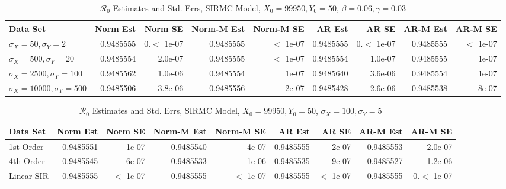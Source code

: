\documentclass[12pt]{article}
\newcommand{\rr}{\ensuremath{\mathcal{R}_0}}
\begin{document}
\begin{table}[H]
	
	\caption{\label{tab:}$\rr$ Estimates and Std. Errs, SIRMC Model,
		$X_0 = 99950, Y_0 = 50$, $\beta = 0.06, \gamma = 0.03$}
	\centering
	\begin{footnotesize}
		\begin{tabular}[t]{l|r|r|r|r|r|r|r|r}
			\hline
			Data Set & Norm Est & Norm SE & Norm-M Est & Norm-M SE & AR Est & AR SE & AR-M Est & AR-M SE\\
			\hline
			$\sigma_X = 50, \sigma_Y = 2$ & 0.9485555 & 0.$<$ 1e-07 & 0.9485555 & $<$ 1e-07 & 0.9485555 & 0.$<$ 1e-07 & 0.9485555 & $<$ 1e-07\\
			\hline
			$\sigma_X = 500, \sigma_Y = 20$ & 0.9485554 & 2.0e-07 & 0.9485555 & $<$ 1e-07 & 0.9485554 & 1.0e-07 & 0.9485555 & 1e-07\\
			\hline
			$\sigma_X = 2500, \sigma_Y = 100$ & 0.9485562 & 1.0e-06 & 0.9485554 & 1e-07 & 0.9485640 & 3.6e-06 & 0.9485554 & 1e-07\\
			\hline
			$\sigma_X = 10000, \sigma_Y = 500$ & 0.9485506 & 3.8e-06 & 0.9485556 & 2e-07 & 0.9485428 & 2.6e-06 & 0.9485538 & 8e-07\\
			\hline
		\end{tabular}
	\end{footnotesize}
\end{table}

\begin{table}[H]
	
	\caption{\label{tab:}$\rr$ Estimates and Std. Errs, SIRMC Model,
		$X_0 = 99950, Y_0 = 50$, $\sigma_X = 100, \sigma_Y = 5$}
	\centering
	\begin{footnotesize}
		\begin{tabular}[t]{l|r|r|r|r|r|r|r|r}
			\hline
			Data Set & Norm Est & Norm SE & Norm-M Est & Norm-M SE & AR Est & AR SE & AR-M Est & AR-M SE\\
			\hline
			1st Order & 0.9485551 & 1e-07 & 0.9485540 & 4e-07 & 0.9485555 & 2e-07 & 0.9485553 & 2.0e-07\\
			\hline
			4th Order & 0.9485545 & 6e-07 & 0.9485533 & 1e-06 & 0.9485535 & 9e-07 & 0.9485527 & 1.2e-06\\
			\hline
			Linear SIR & 0.9485555 & $<$ 1e-07 & 0.9485555 & $<$ 1e-07 & 0.9485555 & $<$ 1e-07 & 0.9485555 & 0.$<$ 1e-07\\
			\hline
		\end{tabular}
	\end{footnotesize}
\end{table}
\end{document}
